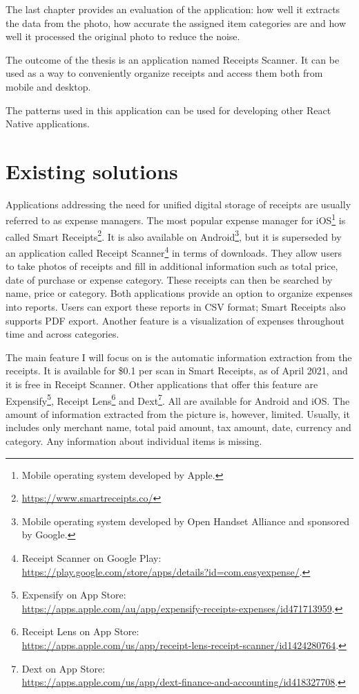 \documentclass[
  digital, %
  table,   %
  oneside, %
  lof,     %
  lot,     %
]{fithesis3}
\begin{document}
The last chapter provides an evaluation of the application: how well it extracts the data from the photo, how accurate the assigned item categories are and how well it processed the original photo to reduce the noise.

The outcome of the thesis is an application named Receipts Scanner. It can be used as a way to conveniently organize receipts and access them both from mobile and desktop. 

The patterns used in this application can be used for developing other React Native applications. 

\chapter{Existing solutions}

Applications addressing the need for unified digital storage of receipts are usually referred to as expense managers. The most popular expense manager for iOS\footnote{Mobile operating system developed by Apple.} is called Smart Receipts\footnote{\url{https://www.smartreceipts.co/}}. It is also available on Android\footnote{ Mobile operating system developed by Open Handset Alliance and sponsored by Google.}, but it is superseded by an application called Receipt Scanner\footnote{Receipt Scanner on Google Play:\\\url{https://play.google.com/store/apps/details?id=com.easyexpense/}.} in terms of downloads. They allow users to take photos of receipts and fill in additional information such as total price, date of purchase or expense category. These receipts can then be searched by name, price or category. Both applications provide an option to organize expenses into reports. Users can export these reports in CSV format; Smart Receipts also supports PDF export. Another feature is a visualization of expenses throughout time and across categories.

The main feature I will focus on is the automatic information extraction from the receipts. It is available for \$0.1 per scan in Smart Receipts, as of April 2021, and it is free in Receipt Scanner. Other applications that offer this feature are Expensify\footnote{Expensify on App Store:\\\url{https://apps.apple.com/au/app/expensify-receipts-expenses/id471713959}.}, Receipt Lens\footnote{Receipt Lens on App Store:\\\url{https://apps.apple.com/us/app/receipt-lens-receipt-scanner/id1424280764}.} and Dext\footnote{Dext on App Store:\\\url{https://apps.apple.com/us/app/dext-finance-and-accounting/id418327708}.}. All are available for Android and iOS. The amount of information extracted from the picture is, however, limited. Usually, it includes only merchant name, total paid amount, tax amount, date, currency and category. Any information about individual items is missing.
\end{document}
